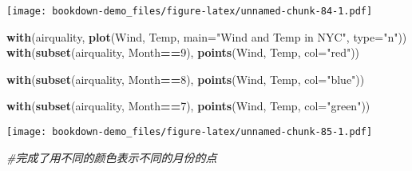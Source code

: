 \documentclass[]{book}
\newenvironment{Shaded}{\begin{snugshade}}{\end{snugshade}}
\newcommand{\CommentTok}[1]{\textcolor[rgb]{0.56,0.35,0.01}{\textit{#1}}}
\newcommand{\DataTypeTok}[1]{\textcolor[rgb]{0.13,0.29,0.53}{#1}}
\newcommand{\DecValTok}[1]{\textcolor[rgb]{0.00,0.00,0.81}{#1}}
\newcommand{\KeywordTok}[1]{\textcolor[rgb]{0.13,0.29,0.53}{\textbf{#1}}}
\newcommand{\NormalTok}[1]{#1}
\newcommand{\OperatorTok}[1]{\textcolor[rgb]{0.81,0.36,0.00}{\textbf{#1}}}
\newcommand{\StringTok}[1]{\textcolor[rgb]{0.31,0.60,0.02}{#1}}
\begin{document}
\texttt{[image: bookdown-demo\_files/figure-latex/unnamed-chunk-84-1.pdf]}

\begin{Shaded}
\begin{Highlighting}[]
\KeywordTok{with}\NormalTok{(airquality, }\KeywordTok{plot}\NormalTok{(Wind, Temp,}
                      \DataTypeTok{main=}\StringTok{"Wind and Temp in NYC"}\NormalTok{,}
                      \DataTypeTok{type=}\StringTok{"n"}\NormalTok{))}
\KeywordTok{with}\NormalTok{(}\KeywordTok{subset}\NormalTok{(airquality, Month}\OperatorTok{==}\DecValTok{9}\NormalTok{), }
     \KeywordTok{points}\NormalTok{(Wind, Temp, }\DataTypeTok{col=}\StringTok{"red"}\NormalTok{))}

\KeywordTok{with}\NormalTok{(}\KeywordTok{subset}\NormalTok{(airquality, Month}\OperatorTok{==}\DecValTok{8}\NormalTok{), }
     \KeywordTok{points}\NormalTok{(Wind, Temp, }\DataTypeTok{col=}\StringTok{"blue"}\NormalTok{))}

\KeywordTok{with}\NormalTok{(}\KeywordTok{subset}\NormalTok{(airquality, Month}\OperatorTok{==}\DecValTok{7}\NormalTok{), }
     \KeywordTok{points}\NormalTok{(Wind, Temp, }\DataTypeTok{col=}\StringTok{"green"}\NormalTok{))}
\end{Highlighting}
\end{Shaded}

\texttt{[image: bookdown-demo\_files/figure-latex/unnamed-chunk-85-1.pdf]}

\begin{Shaded}
\begin{Highlighting}[]
\CommentTok{#完成了用不同的颜色表示不同的月份的点}
\end{Highlighting}
\end{Shaded}
\end{document}
